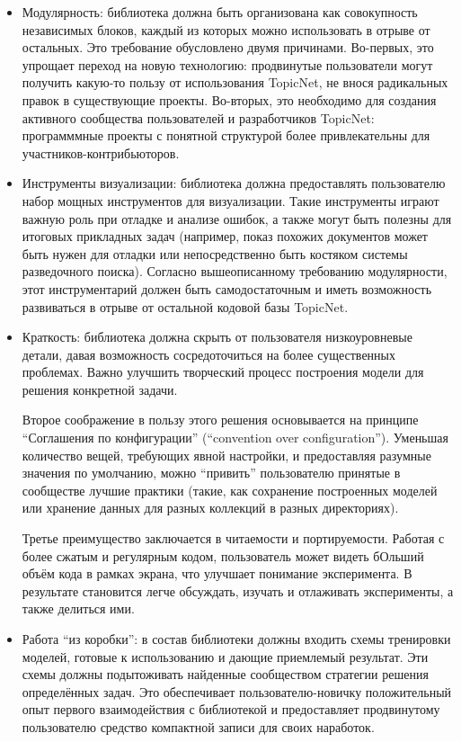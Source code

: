 \begin{itemize}
\item{Модулярность: библиотека должна быть организована как совокупность независимых блоков, каждый из которых можно использовать в отрыве от остальных. Это требование обусловлено двумя причинами. Во-первых, это упрощает переход на новую технологию: продвинутые пользователи могут получить какую-то пользу от использования TopicNet, не внося радикальных правок в существующие проекты. Во-вторых, это необходимо для создания активного сообщества пользователей и разработчиков TopicNet: программмные проекты с понятной структурой более привлекательны для участников-контрибьюторов.}

\item{Инструменты визуализации: библиотека должна предоставлять пользователю набор мощных инструментов для визуализации. 
Такие инструменты играют важную роль при отладке и анализе ошибок, а также могут быть полезны для итоговых прикладных задач (например, показ похожих документов может быть нужен для отладки или непосредственно быть костяком системы разведочного поиска). 
Согласно вышеописанному требованию модулярности, этот инструментарий должен быть самодостаточным и иметь возможность развиваться в отрыве от остальной кодовой базы TopicNet.}

\item{Краткость: библиотека должна скрыть от пользователя низкоуровневые детали, давая возможность сосредоточиться на более существенных проблемах. Важно улучшить творческий процесс построения модели для решения конкретной задачи. 

Второе соображение в пользу этого решения основывается на принципе ``Соглашения по конфигурации'' (``convention over configuration''). Уменьшая количество вещей, требующих явной настройки, и предоставляя разумные значения по умолчанию, можно ``привить'' пользователю принятые в сообществе лучшие практики (такие, как сохранение построенных моделей или хранение данных для разных коллекций в разных директориях).

Третье преимущество заключается в читаемости и портируемости. Работая с более сжатым и регулярным кодом, пользователь может видеть бОльший объём кода в рамках экрана, что улучшает понимание эксперимента. В результате становится легче обсуждать, изучать и отлаживать эксперименты, а также делиться ими.}

\item{Работа ``из коробки'': в состав библиотеки должны входить схемы тренировки моделей, готовые к использованию и дающие приемлемый результат. Эти схемы должны подытоживать найденные сообществом стратегии решения определённых задач. Это обеспечивает пользователю-новичку положительный опыт первого взаимодействия с библиотекой и предоставляет продвинутому пользователю средство компактной записи для своих наработок.}

\end{itemize}

